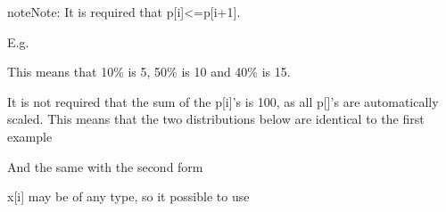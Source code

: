 \documentclass[letterpaper,10pt,english]{sphinxmanual}
\begin{document}
\begin{sphinxadmonition}{note}{Note:}
It is required that p{[}i{]}\textless{}=p{[}i+1{]}.
\end{sphinxadmonition}

E.g.

%
\begin{sphinxVerbatim}[commandchars=\\\{\}]
       
\end{sphinxVerbatim}

This means that 10\% is 5, 50\% is 10 and 40\% is 15.

It is not required that the sum of the p{[}i{]}’s is 100, as all p{[}{]}’s are automatically scaled. This means that the two distributions below are
identical to the first example

%
\begin{sphinxVerbatim}[commandchars=\\\{\}]
       
              
\end{sphinxVerbatim}

And the same with the second form

%
\begin{sphinxVerbatim}[commandchars=\\\{\}]
       
\end{sphinxVerbatim}

x{[}i{]} may be of any type, so it possible to use

%
\begin{sphinxVerbatim}[commandchars=\\\{\}]
     
\end{sphinxVerbatim}
\end{document}
